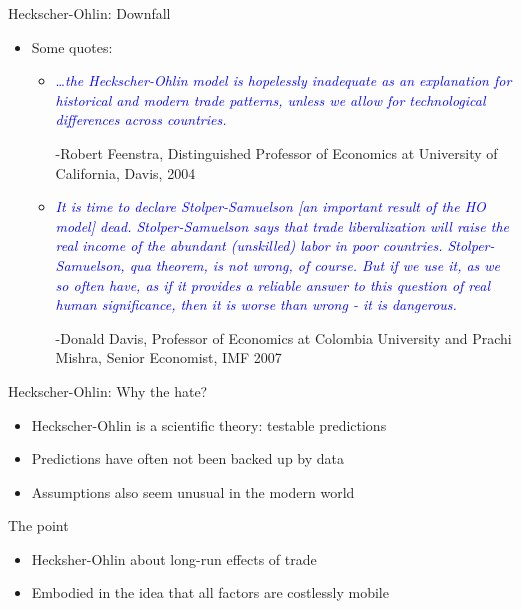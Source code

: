 \documentclass[ignorenonframetext,]{beamer}
\begin{document}
\begin{frame}{Heckscher-Ohlin: Downfall}

    \begin{itemize}
        \item Some quotes: 
            \begin{itemize}
                \item \textcolor{blue}{\dots \emph{the Heckscher-Ohlin model is hopelessly inadequate as an explanation for historical and modern trade patterns, unless we allow for technological differences across countries.} }

-Robert Feenstra, Distinguished Professor of Economics at University of California, Davis, 2004
                \item \textcolor{blue}{\emph{It is time to declare Stolper-Samuelson [an important result of the HO model] dead. Stolper-Samuelson says that trade liberalization will raise the real income of the abundant (unskilled) labor in poor countries.  Stolper-Samuelson, qua theorem, is not wrong, of course. But if we use it, as we so often have, as if it provides a reliable answer to this question of real human significance, then it is worse than wrong - it is dangerous.} }

-Donald Davis, Professor of Economics at Colombia University and Prachi Mishra, Senior Economist, IMF 2007
            \end{itemize}
            
    \end{itemize}

\end{frame}

\begin{frame}{Heckscher-Ohlin: Why the hate?}

    \begin{itemize}
        \item Heckscher-Ohlin is a scientific theory: testable predictions
        \item Predictions have often not been backed up by data
        \item Assumptions also seem unusual in the modern world
    \end{itemize}

\end{frame}

\begin{frame}{The point}

    \begin{itemize}
        \item Hecksher-Ohlin about long-run effects of trade
        \item Embodied in the idea that all factors are costlessly mobile
    \end{itemize}

\end{frame}
\end{document}
